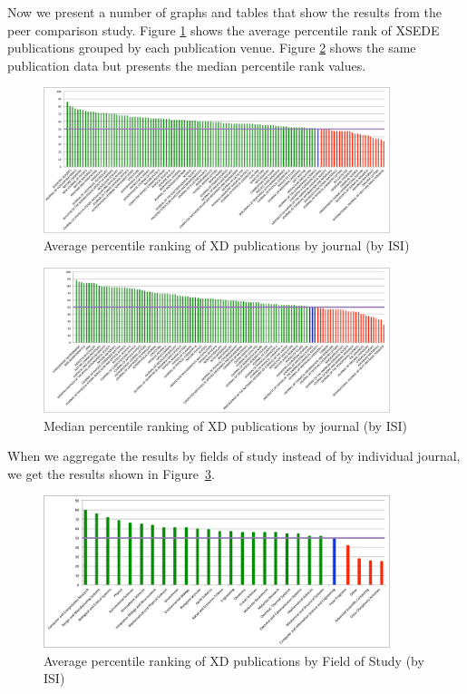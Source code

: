 \documentclass{sig-alternate}
\begin{document}
Now we present a number of graphs and tables that show the results
from the peer comparison study. Figure \ref{F:isi_peers_byj_mean}
shows the average percentile rank of XSEDE publications grouped by
each publication venue. Figure \ref{F:isi_peers_byj_median} shows the
same publication data but presents the median percentile rank values.

\begin{figure}[htb!]
  \centering
    \includegraphics[width=0.9\textwidth]{images/isi_peers_byj_mean.pdf}
    \caption{Average percentile ranking of XD publications by journal (by ISI)}
    \label{F:isi_peers_byj_mean}
\end{figure}

\begin{figure}[htb!]
  \centering
    \includegraphics[width=0.9\textwidth]{images/isi_peers_byj_median.pdf}
    \caption{Median percentile ranking of XD publications by journal (by ISI)}
    \label{F:isi_peers_byj_median}
\end{figure}

When we aggregate the results by fields of study instead of by
individual journal, we get the results shown in Figure~\ref{F:isi_peers_fos}.

\begin{figure}[htb!]
  \centering
    \includegraphics[width=0.9\textwidth]{images/isi_peers_fos.pdf}
    \caption{Average percentile ranking of XD publications by Field of Study (by ISI)}
    \label{F:isi_peers_fos}
\end{figure}
\end{document}
